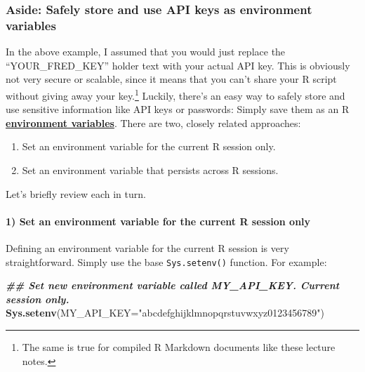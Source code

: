 \documentclass[
]{article}
\newenvironment{Shaded}{\begin{snugshade}}{\end{snugshade}}
\newcommand{\AttributeTok}[1]{\textcolor[rgb]{0.13,0.29,0.53}{#1}}
\newcommand{\DocumentationTok}[1]{\textcolor[rgb]{0.56,0.35,0.01}{\textbf{\textit{#1}}}}
\newcommand{\FunctionTok}[1]{\textcolor[rgb]{0.13,0.29,0.53}{\textbf{#1}}}
\newcommand{\NormalTok}[1]{#1}
\newcommand{\StringTok}[1]{\textcolor[rgb]{0.31,0.60,0.02}{#1}}
\providecommand{\tightlist}{%
  \setlength{\itemsep}{0pt}\setlength{\parskip}{0pt}}
\begin{document}
\hypertarget{aside-safely-store-and-use-api-keys-as-environment-variables}{%
\subsubsection{Aside: Safely store and use API keys as environment
variables}\label{aside-safely-store-and-use-api-keys-as-environment-variables}}

In the above example, I assumed that you would just replace the
``YOUR\_FRED\_KEY'' holder text with your actual API key. This is
obviously not very secure or scalable, since it means that you can't
share your R script without giving away your key.\footnote{The same is
  true for compiled R Markdown documents like these lecture notes.}
Luckily, there's an easy way to safely store and use sensitive
information like API keys or passwords: Simply save them as an R
\href{https://stat.ethz.ch/R-manual/R-devel/library/base/html/EnvVar.html}{\textbf{environment
variables}}. There are two, closely related approaches:

\begin{enumerate}
\def\labelenumi{\arabic{enumi}.}
\tightlist
\item
  Set an environment variable for the current R session only.
\item
  Set an environment variable that persists across R sessions.
\end{enumerate}

Let's briefly review each in turn.

\hypertarget{set-an-environment-variable-for-the-current-r-session-only}{%
\paragraph{1) Set an environment variable for the current R session
only}\label{set-an-environment-variable-for-the-current-r-session-only}}

Defining an environment variable for the current R session is very
straightforward. Simply use the base \texttt{Sys.setenv()} function. For
example:

\begin{Shaded}
\begin{Highlighting}[]
\DocumentationTok{\#\# Set new environment variable called MY\_API\_KEY. Current session only.}
\FunctionTok{Sys.setenv}\NormalTok{(}\AttributeTok{MY\_API\_KEY=}\StringTok{"abcdefghijklmnopqrstuvwxyz0123456789"}\NormalTok{) }
\end{Highlighting}
\end{Shaded}
\end{document}
